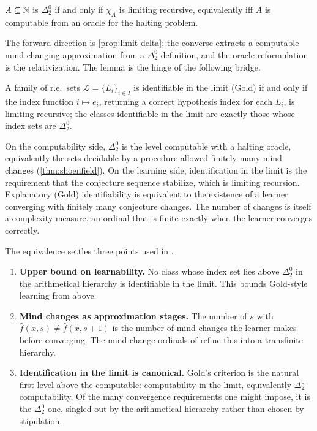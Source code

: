 \begin{thm}
\label{thm:shoenfield}
$A \subseteq \mathbb{N}$ is $\Delta^0_2$ if and only if $\chi_A$ is limiting recursive, equivalently iff $A$ is computable from an oracle for the halting problem.
\end{thm}

The forward direction is \cref{prop:limit-delta}; the converse extracts a computable mind-changing approximation from a $\Delta^0_2$ definition, and the oracle reformulation is the relativization. The lemma is the hinge of the following bridge.

\begin{thm}
\label{thm:limit-bridge}
A family of r.e.\ sets $\mathcal{L} = \{L_i\}_{i \in I}$ is identifiable in the limit (Gold) if and only if the index function $i \mapsto e_i$, returning a correct hypothesis index for each $L_i$, is limiting recursive; the classes identifiable in the limit are exactly those whose index sets are $\Delta^0_2$.
\end{thm}

On the computability side, $\Delta^0_2$ is the level computable with a halting oracle, equivalently the sets decidable by a procedure allowed finitely many mind changes (\cref{thm:shoenfield}). On the learning side, identification in the limit is the requirement that the conjecture sequence stabilize, which is limiting recursion. Explanatory (Gold) identifiability is equivalent to the existence of a learner converging with finitely many conjecture changes. The number of changes is itself a complexity measure, an ordinal that is finite exactly when the learner converges correctly.

The equivalence settles three points used in .

\begin{enumerate}[leftmargin=*,itemsep=3pt]
\item \textbf{Upper bound on learnability.} No class whose index set lies above $\Delta^0_2$ in the arithmetical hierarchy is identifiable in the limit. This bounds Gold-style learning from above.

\item \textbf{Mind changes as approximation stages.} The number of $s$ with $\hat{f}(x,s) \neq \hat{f}(x,s+1)$ is the number of mind changes the learner makes before converging. The mind-change ordinals of  refine this into a transfinite hierarchy.

\item \textbf{Identification in the limit is canonical.} Gold's criterion is the natural first level above the computable: computability-in-the-limit, equivalently $\Delta^0_2$-computability. Of the many convergence requirements one might impose, it is the $\Delta^0_2$ one, singled out by the arithmetical hierarchy rather than chosen by stipulation.
\end{enumerate}

